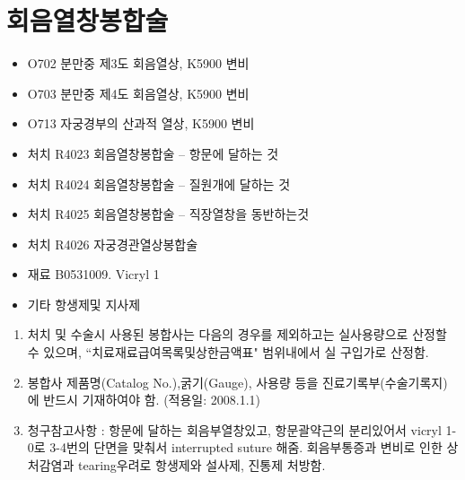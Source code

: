\section{회음열창봉합술} 
\myde{}
{
\begin{itemize}\tightlist
\item[\dsjuridical] O702 분만중 제3도 회음열상, K5900 변비
\item[\dsjuridical] O703 분만중 제4도 회음열상, K5900 변비
\item[\dsjuridical] O713 자궁경부의 산과적 열상, K5900 변비
\item[\dsmedical] 처치 R4023 회음열창봉합술 – 항문에 달하는 것 
\item[\dsmedical] 처치 R4024 회음열창봉합술 – 질원개에 달하는 것 
\item[\dsmedical] 처치 R4025 회음열창봉합술 – 직장열창을 동반하는것 
\item[\dsmedical] 처치 R4026 자궁경관열상봉합술 
\item[\dsmedical] 재료 B0531009. Vicryl 1
\item[\dsmedical] 기타 항생제및 지사제
\end{itemize}
}
{
\begin{enumerate}\tightlist 
\item 처치 및 수술시 사용된 봉합사는 다음의 경우를 제외하고는 실사용량으로 산정할 수 있으며, ``치료재료급여목록및상한금액표" 범위내에서 실 구입가로 산정함.
\item 봉합사 제품명(Catalog No.),굵기(Gauge), 사용량 등을 진료기록부(수술기록지) 에 반드시 기재하여야 함. (적용일: 2008.1.1)
\item 청구참고사항 : 항문에 달하는 회음부열창있고, 항문괄약근의 분리있어서 vicryl 1-0로 3-4번의 단면을 맞춰서 interrupted suture  해줌. 회음부통증과 변비로 인한 상처감염과 tearing우려로 항생제와 설사제, 진통제 처방함.
\end{enumerate}
}

\par
\medskip
\prezi{\clearpage}
